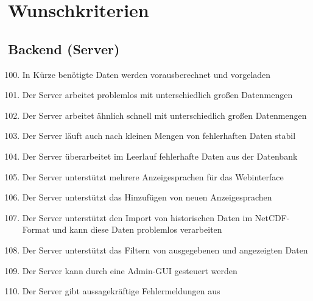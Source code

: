 \section{Wunschkriterien}
\subsection{Backend (Server)}
\begin{enumerate}[label=\textbf{WK\arabic{enumi}0}]
	\setcounter{enumi}{99}
	\item In Kürze benötigte Daten werden vorausberechnet und vorgeladen
	\item Der Server arbeitet problemlos mit unterschiedlich großen Datenmengen
	\item Der Server arbeitet ähnlich schnell mit unterschiedlich großen Datenmengen
	\item Der Server läuft auch nach kleinen Mengen von fehlerhaften Daten stabil
	\item Der Server überarbeitet im Leerlauf fehlerhafte Daten aus der Datenbank
	\item Der Server unterstützt mehrere Anzeigesprachen für das Webinterface
	\item Der Server unterstützt das Hinzufügen von neuen Anzeigesprachen
	\item Der Server unterstützt den Import von historischen Daten im NetCDF-Format und kann diese Daten problemlos verarbeiten
	\item Der Server unterstützt das Filtern von ausgegebenen und angezeigten Daten
	\item Der Server kann durch eine Admin-GUI gesteuert werden
	\item Der Server gibt aussagekräftige Fehlermeldungen aus
\end{enumerate}
